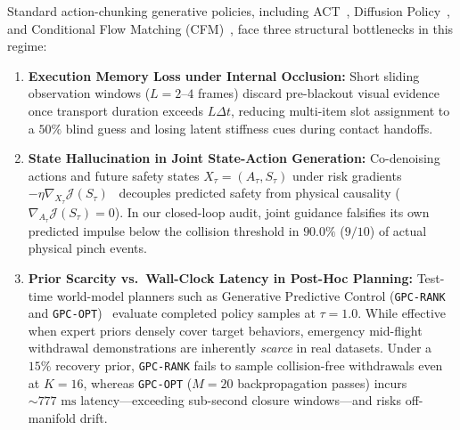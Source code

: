 \documentclass[letterpaper, 10pt, conference]{ieeeconf}
\begin{document}
Standard action-chunking generative policies, including ACT~\cite{zhao2023act}, Diffusion Policy~\cite{chi2024diffusion}, and Conditional Flow Matching (CFM)~\cite{lipman2023flow}, face three structural bottlenecks in this regime:
\begin{enumerate}
    \item \textbf{Execution Memory Loss under Internal Occlusion:} Short sliding observation windows ($L = 2\text{--}4$ frames) discard pre-blackout visual evidence once transport duration exceeds $L\Delta t$, reducing multi-item slot assignment to a $50\%$ blind guess and losing latent stiffness cues during contact handoffs.
    \item \textbf{State Hallucination in Joint State-Action Generation:} Co-denoising actions and future safety states $X_\tau = (A_\tau, S_\tau)$ under risk gradients $-\eta \nabla_{X_\tau} \mathcal{J}(S_\tau)$~\cite{janner2022diffuser} decouples predicted safety from physical causality ($\nabla_{A_\tau}\mathcal{J}(S_\tau) = 0$). In our closed-loop audit, joint guidance falsifies its own predicted impulse below the collision threshold in $90.0\%$ ($9/10$) of actual physical pinch events.
    \item \textbf{Prior Scarcity vs.\ Wall-Clock Latency in Post-Hoc Planning:} Test-time world-model planners such as Generative Predictive Control (\texttt{GPC-RANK} and \texttt{GPC-OPT})~\cite{qi2026gpc} evaluate completed policy samples at $\tau = 1.0$. While effective when expert priors densely cover target behaviors, emergency mid-flight withdrawal demonstrations are inherently \emph{scarce} in real datasets. Under a $15\%$ recovery prior, \texttt{GPC-RANK} fails to sample collision-free withdrawals even at $K=16$, whereas \texttt{GPC-OPT} ($M=20$ backpropagation passes) incurs $\sim 777\text{ ms}$ latency---exceeding sub-second closure windows---and risks off-manifold drift.
\end{enumerate}
\end{document}
